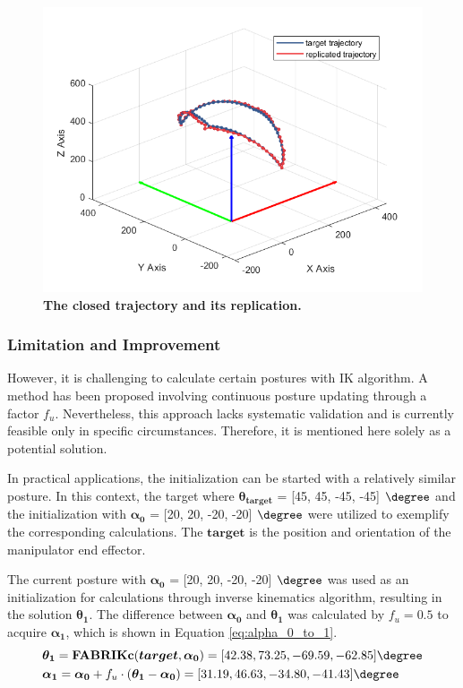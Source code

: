 \begin{figure}[H] %
    \centering 
    \captionsetup{labelsep=colon}
    \includegraphics[width=.9\textwidth]{Image/Result/circle_trajectory_replication.png} 
    \caption[The closed trajectory and its replication by IK algorithm]
    {\centering \textbf{The closed trajectory and its replication.}}
    \label{fig:clc_cross}
\end{figure}
\subsubsection{Limitation and Improvement}
However, it is challenging to calculate certain postures with IK algorithm. A method has 
been proposed involving continuous posture updating through a factor $f_u$. Nevertheless, this approach 
lacks systematic validation and is currently feasible only in specific circumstances. Therefore, it is 
mentioned here solely as a potential solution.

In practical applications, the initialization can be started with a relatively similar posture. 
In this context, the target where $\boldsymbol{\theta_{target}}$ = 
[45, 45, -45, -45] $\degree$ and the initialization with $\boldsymbol{\alpha_0}$ = [20, 20, -20, -20] $\degree$ 
were utilized to exemplify the corresponding calculations. The $\boldsymbol{target}$ is the position and 
orientation of the manipulator end effector.

The current posture with $\boldsymbol{\alpha_0}$  = [20, 20, -20, -20] $\degree$ was used as an initialization 
for calculations through inverse kinematics algorithm, resulting in the solution $\boldsymbol{\theta_1}$. 
The difference between $\boldsymbol{\alpha_0}$ and $\boldsymbol{\theta_1}$ was calculated by $f_u = 0.5$ to acquire 
$\boldsymbol{\alpha_1}$, which is shown in Equation \ref{eq:alpha_0_to_1}.
\begin{align}
    &\boldsymbol{\theta_1} = \textbf{FABRIKc}(\boldsymbol{target}, \boldsymbol{\alpha_0}) 
    = [42.38, 73.25, -69.59, -62.85]\degree \nonumber \\
    &\boldsymbol{\alpha_1} = \boldsymbol{\alpha_0} + f_u \cdot (\boldsymbol{\theta_1} - \boldsymbol{\alpha_0}) 
    = [31.19, 46.63, -34.80, -41.43]\degree
    \label{eq:alpha_0_to_1}
\end{align}

